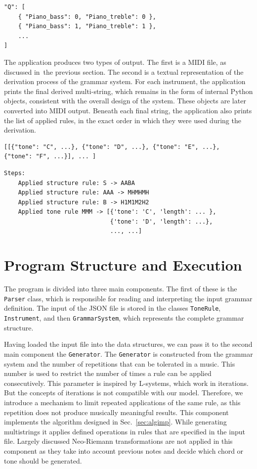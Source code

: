 \begin{verbatim}
"Q": [
    { "Piano_bass": 0, "Piano_treble": 0 },
    { "Piano_bass": 1, "Piano_treble": 1 },
    ...
]
\end{verbatim}

The application produces two types of output. The first is a MIDI file, as discussed in~the previous section. The second is a textual representation of the derivation process of the grammar system. For each instrument, the application prints the final derived multi-string, which remains in the form of internal Python objects, consistent with the overall design of the system. These objects are later converted into MIDI output. Beneath each final string, the application also prints the list of applied rules, in the exact order in which they were used during the derivation.

\begin{verbatim}
[[{"tone": "C", ...}, {"tone": "D", ...}, {"tone": "E", ...}, 
{"tone": "F", ...}], ... ]
\end{verbatim}

\begin{verbatim}
Steps:
    Applied structure rule: S -> AABA
    Applied structure rule: AAA -> MHMHMH
    Applied structure rule: B -> H1M1M2H2
    Applied tone rule MMM -> [{'tone': 'C', 'length': ... }, 
                              {'tone': 'D', 'length': ...},
                              ..., ...]
\end{verbatim}

\section{Program Structure and Execution}
The program is divided into three main components. The first of these is the \texttt{Parser} class, which is responsible for reading and interpreting the input grammar definition. The input of the JSON file is stored in the classes \texttt{ToneRule}, \texttt{Instrument}, and then \texttt{GrammarSystem}, which represents the complete grammar structure. 

Having loaded the input file into the data structures, we can pass it to the second main component the \texttt{Generator}. The \texttt{Generator} is constructed from the grammar system and the number of repetitions that can be tolerated in a music. This number is used to restrict the number of times a rule can be applied consecutively. This parameter is inspired by L-systems, which work in iterations. But the concepts of iterations is not compatible with our model. Therefore, we introduce a mechanism to limit repeated applications of the same rule, as this repetition does not produce musically meaningful results. This component implements the algorithm designed in Sec.~\ref{sec:algimp}. While generating multistrings it applies defined operations in rules that are specified in the input file. Largely discussed Neo-Riemann transformations are not applied in this component as they take into account previous notes and decide which chord or tone should be generated.

